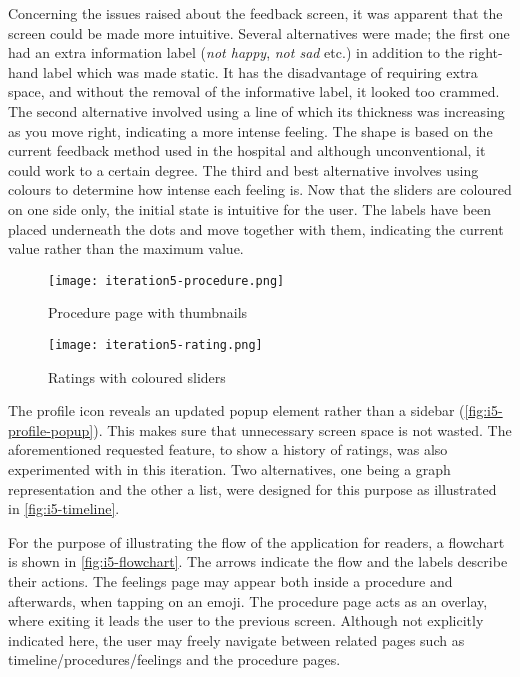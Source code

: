 Concerning the issues raised about the feedback screen, it was apparent that the screen could be made more intuitive. Several alternatives were made; the first one had an extra information label (\emph{not happy}, \emph{not sad} etc.) in addition to the right-hand label which was made static. It has the disadvantage of requiring extra space, and without the removal of the informative label, it looked too crammed. The second alternative involved using a line of which its thickness was increasing as you move right, indicating a more intense feeling. The shape is based on the current feedback method used in the hospital and although unconventional, it could work to a certain degree. The third and best alternative involves using colours to determine how intense each feeling is. Now that the sliders are coloured on one side only, the initial state is intuitive for the user. The labels have been placed underneath the dots and move together with them, indicating the current value rather than the maximum value.

\begin{sidewaysfigure}
    \centering
    \hspace{\fill}
    \begin{minipage}{0.4\textwidth}
        \centering
        \texttt{[image: iteration5-procedure.png]}
        \caption{Procedure page with thumbnails}
        \label{fig:i5-procedure}
    \end{minipage}
    \hspace{\fill}
    \begin{minipage}{0.4\textwidth}
        \centering
        \texttt{[image: iteration5-rating.png]}
        \caption{Ratings with coloured sliders}
        \label{fig:i5-rating}
    \end{minipage}
    \hspace*{\fill}
\end{sidewaysfigure}

The profile icon reveals an updated popup element rather than a sidebar (\autoref{fig:i5-profile-popup}). This makes sure that unnecessary screen space is not wasted. The aforementioned requested feature, to show a history of ratings, was also experimented with in this iteration. Two alternatives, one being a graph representation and the other a list, were designed for this purpose as illustrated in \autoref{fig:i5-timeline}.

For the purpose of illustrating the flow of the application for readers, a flowchart is shown in \autoref{fig:i5-flowchart}. The arrows indicate the flow and the labels describe their actions. The feelings page may appear both inside a procedure and afterwards, when tapping on an emoji. The procedure page acts as an overlay, where exiting it leads the user to the previous screen. Although not explicitly indicated here, the user may freely navigate between related pages such as timeline/procedures/feelings and the procedure pages.

